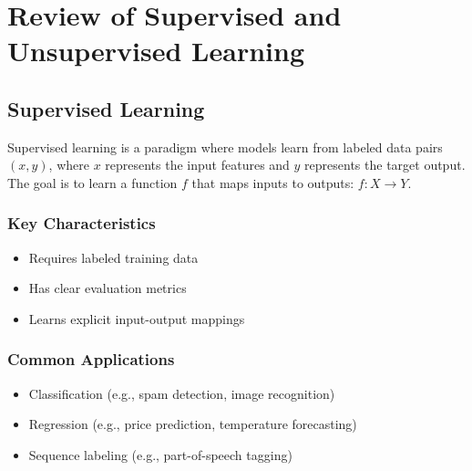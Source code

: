 \section{Review of Supervised and Unsupervised Learning}
\label{sec:review_of_supervised_and_unsupervised_learning}

\subsection{Supervised Learning}

\noindent
Supervised learning is a paradigm where models learn from labeled data pairs $(x, y)$, where $x$ represents the input features and $y$ represents the target output. The goal is to learn a function $f$ that maps inputs to outputs: $f: X \rightarrow Y$.

\subsubsection{Key Characteristics}
\begin{itemize}[noitemsep]
    \item Requires labeled training data
    \item Has clear evaluation metrics
    \item Learns explicit input-output mappings
\end{itemize}

\subsubsection{Common Applications}
\begin{itemize}[noitemsep]
    \item Classification (e.g., spam detection, image recognition)
    \item Regression (e.g., price prediction, temperature forecasting)
    \item Sequence labeling (e.g., part-of-speech tagging)
\end{itemize}

